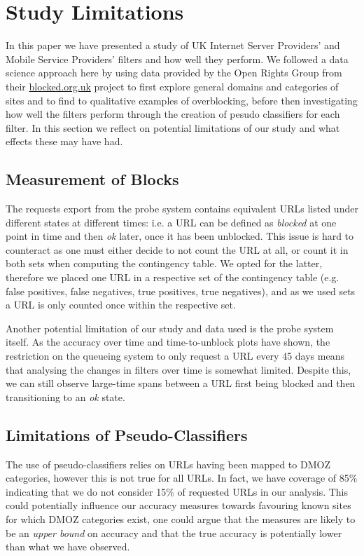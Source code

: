 \documentclass{bmcart}
\begin{document}
\section*{Study Limitations}
In this paper we have presented a study of UK Internet Server Providers' and Mobile Service Providers' filters and how well they perform.
We followed a data science approach here by using data provided by the Open Rights Group from their \url{blocked.org.uk} project to first explore general domains and categories of sites and to find to qualitative examples of overblocking, before then investigating how well the filters perform through the creation of pesudo classifiers for each filter.
In this section we reflect on potential limitations of our study and what effects these may have had.

\subsection*{Measurement of Blocks}
The requests export from the probe system contains equivalent URLs listed under different states at different times: i.e. a URL can be defined as \textit{blocked} at one point in time and then \textit{ok} later, once it has been unblocked.
This issue is hard to counteract as one must either decide to not count the URL at all, or count it in both sets when computing the contingency table.
We opted for the latter, therefore we placed one URL in a respective set of the contingency table (e.g. false positives, false negatives, true positives, true negatives), and as we used sets a URL is only counted once within the respective set.

Another potential limitation of our study and data used is the probe system itself. 
As the accuracy over time and time-to-unblock plots have shown, the restriction on the queueing system to only request a URL every 45 days means that analysing the changes in filters over time is somewhat limited.
Despite this, we can still observe large-time spans between a URL first being blocked and then transitioning to an \textit{ok} state.

\subsection*{Limitations of Pseudo-Classifiers}
The use of pseudo-classifiers relies on URLs having been mapped to DMOZ categories, however this is not true for all URLs.
In fact, we have coverage of 85\% indicating that we do not consider 15\% of requested URLs in our analysis.
This could potentially influence our accuracy measures towards favouring known sites for which DMOZ categories exist, one could argue that the measures are likely to be an \textit{upper bound} on accuracy and that the true accuracy is potentially lower than what we have observed.
\end{document}
